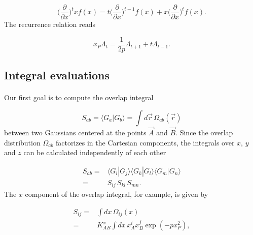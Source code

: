 \documentclass[%
twoside,                 %
final,                   %
10pt]{article}
\begin{document}
\begin{equation}
\label{eq:derivation_rule}
 \Big(\frac{\partial}{\partial x}\Big)^t x f(x) = t\Big(\frac{\partial}{\partial x}\Big)^{t-1}f(x) + x\Big(\frac{\partial}{\partial x}\Big)^t f(x).
\end{equation}
The recurrence relation reads

\begin{equation}
\label{eq:hermite_gaussian_recurrence}
 x_P \Lambda_t = \frac{1}{2p}\Lambda_{t+1} + t\Lambda_{t-1}.
\end{equation}



\subsection{Integral evaluations}

\paragraph{}

Our first goal is to compute the overlap integral

\begin{equation}
S_{ab}  = \langle G_a|G_b\rangle = \int d\vec r \,\Omega_{ab}(\vec r)
\end{equation}
between two Gaussians centered at the points $\vec A$ and $\vec B$.
Since the overlap distribution $\Omega_{ab}$ factorizes in the Cartesian components, the integrals over $x$, $y$ and $z$ can be calculated independently of each other

\begin{equation}
\begin{split}
 S_{ab} = & \langle G_i|G_j\rangle \langle G_k|G_l\rangle \langle G_m|G_n\rangle \\
        = & S_{ij}\,S_{kl}\,S_{mn}.
\end{split}
\end{equation}
The $x$ component of the overlap integral, for example, is given by

\begin{equation}
\label{eq:intG_ij}
\begin{split}
 S_{ij} = & \int dx \,\Omega_{ij}(x) \\
        = & K_{AB}^x\int dx \,x_A^ix_B^j\exp(-px_P^2),
\end{split}
\end{equation}
\end{document}
